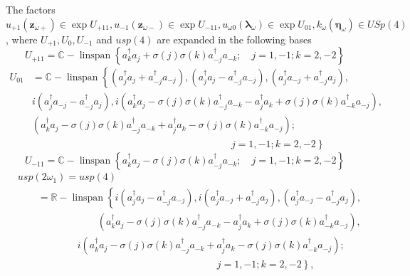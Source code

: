 \documentclass[12pt,aps,amsfonts,amssymb,tightenlines]{revtex4}%
\begin{document}
The factors $u_{+1}\left(  \mathbf{z}_{\omega+}\right)  \in\exp U_{+11}%
,u_{-1}\left(  \mathbf{z}_{\omega-}\right)  \in\exp U_{-11},u_{\omega0}\left(
\mathbf{\lambda}_{\omega}\right)  \in\exp U_{01},k_{\omega}\left(
\mathbf{\eta}_{\omega}\right)  \in USp\left(  4\right)  $, where $U_{+1}%
,U_{0},U_{-1}$ and $usp\left(  4\right)  $ are expanded in the following bases%
\begin{equation}
U_{+11}=\mathbb{C-}\operatorname{linspan}\left\{  a_{k}^{\dagger}a_{j}%
+\sigma\left(  j\right)  \sigma\left(  k\right)  a_{-j}^{\dagger}a_{-k};\quad
j=1,-1;k=2,-2\right\}  \label{u1}%
\end{equation}%
\begin{align}
U_{01}  &  =\mathbb{C-}\operatorname{linspan}\left\{  \left(  a_{j}^{\dagger
}a_{j}+a_{-j}^{\dagger}a_{-j}\right)  ,\left(  a_{j}^{\dagger}a_{j}%
-a_{-j}^{\dagger}a_{-j}\right)  ,\left(  a_{j}^{\dagger}a_{-j}+a_{-j}%
^{\dagger}a_{j}\right)  ,\right. \nonumber\\
&  i\left(  a_{j}^{\dagger}a_{-j}-a_{-j}^{\dagger}a_{j}\right)  ,i\left(
a_{k}^{\dagger}a_{j}-\sigma\left(  j\right)  \sigma\left(  k\right)
a_{-j}^{\dagger}a_{-k}-a_{j}^{\dagger}a_{k}+\sigma\left(  j\right)
\sigma\left(  k\right)  a_{-k}^{\dagger}a_{-j}\right)  ,\nonumber\\
&  \left(  a_{k}^{\dagger}a_{j}-\sigma\left(  j\right)  \sigma\left(
k\right)  a_{-j}^{\dagger}a_{-k}+a_{j}^{\dagger}a_{k}-\sigma\left(  j\right)
\sigma\left(  k\right)  a_{-k}^{\dagger}a_{-j}\right)  ;\nonumber\\
&  \quad\quad\quad\quad\quad\quad\quad\quad\quad\quad\quad\quad\quad\quad
\quad\quad\quad\quad\quad\quad\left.  j=1,-1;k=2,-2\overset{}{}\right\}
\label{u2}%
\end{align}%
\begin{equation}
U_{-11}=\mathbb{C-}\operatorname{linspan}\left\{  a_{k}^{\dagger}a_{j}%
-\sigma\left(  j\right)  \sigma\left(  k\right)  a_{-j}^{\dagger}a_{-k};\quad
j=1,-1;k=2,-2\right\}  \label{u3}%
\end{equation}%
\begin{align}
&  usp\left(  2\omega_{1}\right)  =usp\left(  4\right) \nonumber\\
&  \qquad=\mathbb{R-}\operatorname{linspan}\left\{  i\left(  a_{j}^{\dagger
}a_{j}-a_{-j}^{\dagger}a_{-j}\right)  ,i\left(  a_{j}^{\dagger}a_{-j}%
+a_{-j}^{\dagger}a_{j}\right)  ,\left(  a_{j}^{\dagger}a_{-j}-a_{-j}^{\dagger
}a_{j}\right)  ,\right. \nonumber\\
&  \qquad\qquad\qquad\qquad\left(  a_{k}^{\dagger}a_{j}-\sigma\left(
j\right)  \sigma\left(  k\right)  a_{-j}^{\dagger}a_{-k}-a_{j}^{\dagger}%
a_{k}+\sigma\left(  j\right)  \sigma\left(  k\right)  a_{-k}^{\dagger}%
a_{-j}\right)  ,\nonumber\\
&  \qquad\qquad\qquad i\left(  a_{k}^{\dagger}a_{j}-\sigma\left(  j\right)
\sigma\left(  k\right)  a_{-j}^{\dagger}a_{-k}+a_{j}^{\dagger}a_{k}%
-\sigma\left(  j\right)  \sigma\left(  k\right)  a_{-k}^{\dagger}%
a_{-j}\right)  ;\nonumber\\
&  \qquad\qquad\qquad\qquad\qquad\qquad\qquad\qquad\qquad\qquad\left.
j=1,-1;k=2,-2\overset{}{}\right\}  , \label{u4}%
\end{align}
\end{document}
